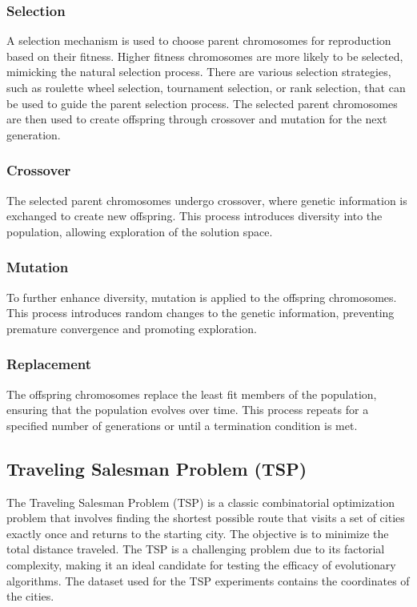 \documentclass[conference]{IEEEtran}
\begin{document}
\subsubsection{Selection}
A selection mechanism is used to choose parent chromosomes for reproduction
based on their fitness. Higher fitness chromosomes are more likely to be
selected, mimicking the natural selection process. There are various selection
strategies, such as roulette wheel selection, tournament selection, or rank
selection, that can be used to guide the parent selection process. The selected
parent chromosomes are then used to create offspring through crossover and
mutation for the next generation.

\subsubsection{Crossover}
The selected parent chromosomes undergo crossover, where genetic information is
exchanged to create new offspring. This process introduces diversity into the
population, allowing exploration of the solution space.

\subsubsection{Mutation}
To further enhance diversity, mutation is applied to the offspring chromosomes.
This process introduces random changes to the genetic information, preventing
premature convergence and promoting exploration.

\subsubsection{Replacement}
The offspring chromosomes replace the least fit members of the population,
ensuring that the population evolves over time. This process repeats for a
specified number of generations or until a termination condition is met.

\subsection{Traveling Salesman Problem (TSP)}
The Traveling Salesman Problem (TSP) is a classic combinatorial optimization
problem that involves finding the shortest possible route that visits a set of
cities exactly once and returns to the starting city. The objective is to
minimize the total distance traveled. The TSP is a challenging problem due to
its factorial complexity, making it an ideal candidate for testing the efficacy
of evolutionary algorithms. The dataset used for the TSP experiments contains
the coordinates of the cities.
\end{document}
